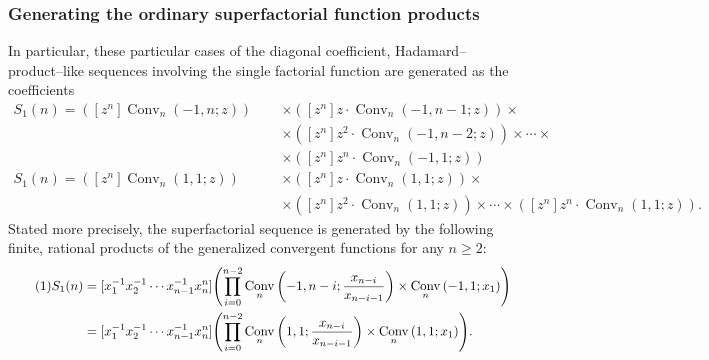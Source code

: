 \documentclass[12pt,reqno]{article}
\numberwithin{sfootnote}{section}
\numberwithin{equation}{section}
\newcommand{\tagonce}[0]{
     \addtocounter{equation}{1}
     \tag{\theequation}
}
\theoremstyle{DefaultTheoremStyle}
\theoremstyle{definition}
\newcommand{\ConvGF}[4]{\ensuremath{\Conv_{#1}\left(#2, #3; #4\right)}}
\DeclareMathOperator{\Conv}{Conv}
\begin{document}
\subsubsection{Generating the ordinary superfactorial function products} 

In particular, 
these particular cases of the 
diagonal coefficient, Hadamard--product--like sequences involving the 
single factorial function are generated as the coefficients 
\begin{align*} 
S_1(n) = 
     \left([z^{n}] \ConvGF{n}{-1}{n}{z}\right) & \times 
     \left([z^{n}] z \cdot \ConvGF{n}{-1}{n-1}{z}\right) 
     \times \\ 
     & \times 
     \left([z^{n}] z^2 \cdot \ConvGF{n}{-1}{n-2}{z}\right) 
     \times \cdots \times \\ 
     & \times 
     \left([z^{n}] z^{n} \cdot \ConvGF{n}{-1}{1}{z}\right) \\ 
S_1(n) = 
     \left([z^{n}] \ConvGF{n}{1}{1}{z}\right) 
     \phantom{_{+1}-} & \times 
     \left([z^{n}] z \cdot \ConvGF{n}{1}{1}{z}\right) 
     \times \\ 
     & \times 
     \left([z^{n}] z^2 \cdot \ConvGF{n}{1}{1}{z}\right) 
     \times \cdots \times 
     \left([z^{n}] z^{n} \cdot \ConvGF{n}{1}{1}{z}\right). 
\end{align*} 
Stated more precisely, the 
superfactorial sequence is generated by the following 
finite, rational products of the generalized convergent functions 
for any $n \geq 2$: 
\begin{align*} 
\tagonce\label{eqn_SuperFactFn_S1n_RationalHP-DiagGF_ProductIdents-stmts_v1} 
S_1(n) 
     & = 
     [x_1^{-1} x_2^{-1} \cdots x_{n-1}^{-1} x_n^{n}] 
     \Biggl( 
     \prod_{i=0}^{n-2} 
     \ConvGF{n}{-1}{n-i}{\frac{x_{n-i}}{x_{n-i-1}}} \times 
     \ConvGF{n}{-1}{1}{x_1} 
     \Biggr) \\ 
     & = 
     [x_1^{-1} x_2^{-1} \cdots x_{n-1}^{-1} x_n^{n}] 
     \Biggl( 
     \prod_{i=0}^{n-2} 
     \ConvGF{n}{1}{1}{\frac{x_{n-i}}{x_{n-i-1}}} \times 
     \ConvGF{n}{1}{1}{x_1} 
     \Biggr). 
\end{align*} 
\end{document}
